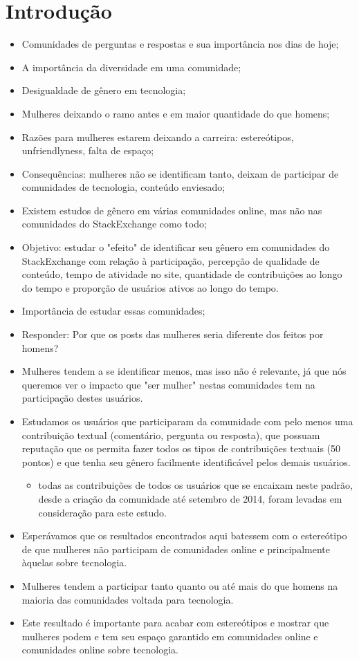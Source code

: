 \chapter{Introdução}

\begin{itemize}
	\item Comunidades de perguntas e respostas e sua importância nos dias de hoje;
	\item A importância da diversidade em uma comunidade;
	\item Desigualdade de gênero em tecnologia;
	\item Mulheres deixando o ramo antes e em maior quantidade do que homens;
	\item Razões para mulheres estarem deixando a carreira: estereótipos, unfriendlyness, falta de espaço;
	\item Consequências: mulheres não se identificam tanto, deixam de participar de comunidades de tecnologia, conteúdo enviesado;
	\item Existem estudos de gênero em várias comunidades online, mas não nas comunidades do StackExchange como todo;
	\item Objetivo: estudar o "efeito" de identificar seu gênero em comunidades do StackExchange com relação à participação, percepção de qualidade de conteúdo, tempo de atividade no site, quantidade de contribuições ao longo do tempo e proporção de usuários ativos ao longo do tempo.
	\item Importância de estudar essas comunidades;
	\item Responder: Por que os posts das mulheres seria diferente dos feitos por homens?
	\item Mulheres tendem a se identificar menos, mas isso não é relevante, já que nós queremos ver o impacto que "ser mulher" nestas comunidades tem na participação destes usuários.
	\item Estudamos os usuários que participaram da comunidade com pelo menos uma contribuição textual (comentário, pergunta ou resposta), que possuam reputação que os permita fazer todos os tipos de contribuições textuais (50 pontos) e que tenha seu gênero facilmente identificável pelos demais usuários.
	\begin{itemize}
		\item todas as contribuições de todos os usuários que se encaixam neste padrão, desde a criação da comunidade até setembro de 2014, foram levadas em consideração para este estudo.
	\end{itemize}
	\item Esperávamos que os resultados encontrados aqui batessem com o estereótipo de que mulheres não participam de comunidades online e principalmente àquelas sobre tecnologia.
	\item Mulheres tendem a participar tanto quanto ou até mais do que homens na maioria das comunidades voltada para tecnologia. 
	\item Este resultado é importante para acabar com estereótipos e mostrar que mulheres podem e tem seu espaço garantido em comunidades online e comunidades online sobre tecnologia.
\end{itemize}